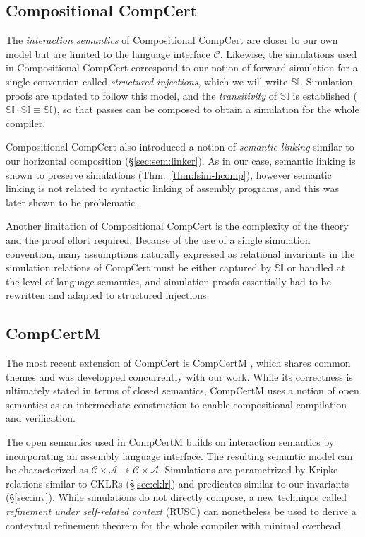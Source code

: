 \documentclass[11pt,oneside,draft]{book}
\theoremstyle{definition}
\begin{document}

\subsection{Compositional CompCert} %

The \emph{interaction semantics} of
Compositional CompCert \citep{compcompcert}
are closer to our own model
but are limited to the language interface $\mathcal{C}$.
Likewise, the simulations used in Compositional CompCert
correspond to our notion of forward simulation
for a single convention called \emph{structured injections},
which we will write $\mathbb{SI}$.
Simulation proofs are updated to follow this model,
and the \emph{transitivity} of $\mathbb{SI}$ is established
($\mathbb{SI} \cdot \mathbb{SI} \equiv \mathbb{SI}$),
so that passes can be composed
to obtain a simulation for the whole compiler.

Compositional CompCert also introduced a notion of \emph{semantic linking}
similar to our horizontal composition
(\S\ref{sec:sem:linker}).
As in our case,
semantic linking is shown to preserve simulations
(Thm.~\ref{thm:fsim-hcomp}),
however semantic linking is not related to
syntactic linking of assembly programs,
and this was later shown to be problematic \citep{compcertm}.

Another limitation of Compositional CompCert
is the complexity of the theory
and the proof effort required.
Because of the use of a single simulation convention,
many assumptions naturally expressed as
relational invariants in the simulation relations of CompCert
must be either captured by $\mathbb{SI}$
or handled at the level of language semantics,
and simulation proofs
essentially had to be rewritten and adapted to
structured injections.


\subsection{CompCertM} %

The most recent extension of CompCert is CompCertM \citep{compcertm},
which shares common themes and was developped concurrently
with our work.
While its correctness
is ultimately stated in terms of closed semantics,
CompCertM uses a notion of open semantics
as an intermediate construction
to enable compositional compilation and verification.

The open semantics used in CompCertM
builds on interaction semantics
by incorporating an assembly language interface.
The resulting semantic model can be characterized as
$\mathcal{C} \times \mathcal{A} \twoheadrightarrow
 \mathcal{C} \times \mathcal{A}$.
Simulations
are parametrized by Kripke relations similar to CKLRs (\S\ref{sec:cklr})
and predicates similar to our invariants (\S\ref{sec:inv}).
While simulations do not directly compose,
a new technique called \emph{refinement under self-related context}
(RUSC)
can nonetheless be used to derive a contextual refinement theorem
for the whole compiler with minimal overhead.
\end{document}
